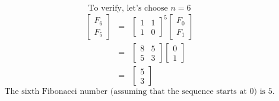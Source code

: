 $$\text{To verify, let's choose } n = 6$$
\begin{eqnarray*}
	\begin{bmatrix}
		F_{6}\\
		F_{5}
	\end{bmatrix}
	&=&
	\begin{bmatrix}
		1 & 1\\
		1 & 0
	\end{bmatrix}^5
	\begin{bmatrix}
		F_{0}\\
		F_{1}
	\end{bmatrix}\\
		&=&
		\begin{bmatrix}
			8 & 5\\
			5 & 3
		\end{bmatrix}
		\begin{bmatrix}
			0\\
			1
		\end{bmatrix}\\
	&=&
	\begin{bmatrix}
		5\\
		3
	\end{bmatrix}
\end{eqnarray*}
$$
\text{The sixth Fibonacci number (assuming that the sequence starts at 0) is 5.}
$$